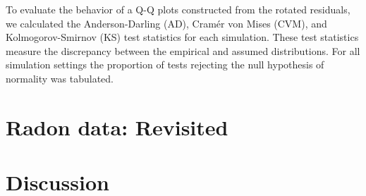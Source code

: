 \documentclass{article} %
\newcommand{\al}[1]{{\color{red} #1}}
\newcommand{\trans}{\ensuremath{^\prime}}
\newcommand{\var}{\ensuremath{\mathrm{Var}}}
\begin{document}
{To evaluate the behavior of a Q-Q plots constructed from the rotated residuals, we calculated the Anderson-Darling (AD), Cram{\'e}r von Mises (CVM), and Kolmogorov-Smirnov (KS) test statistics for each simulation. These test statistics measure the discrepancy between the empirical and assumed distributions. For all simulation settings the proportion of tests rejecting the null hypothesis of normality was tabulated. 
}


\section{Radon data: Revisited}\label{sec:radon2}


\section{Discussion}\label{sec:discussion}


\clearpage
{}


\end{document}

